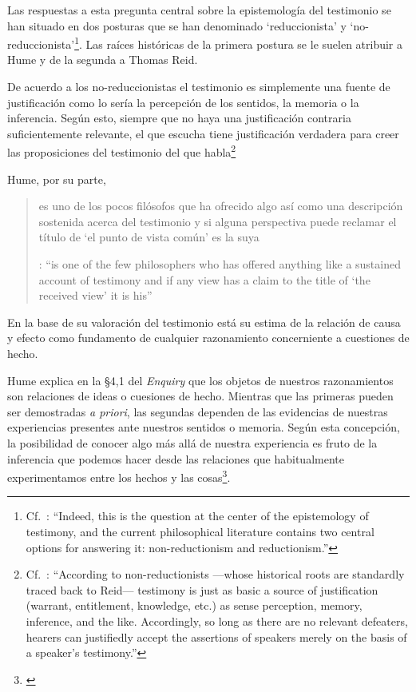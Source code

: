 Las respuestas a esta pregunta central sobre la epistemología del testimonio se han situado en dos posturas que se han denominado `reduccionista' y `no-reduccionista'\footnote{Cf.~\cite[4]{lackeysosa2006eptest}: \enquote{Indeed, this is the question at the center of the epistemology of testimony, and the current philosophical literature contains two central options for answering it: non-reductionism and reductionism.}}. Las raíces históricas de la primera postura se le suelen atribuir a Hume y de la segunda a Thomas Reid.

De acuerdo a los no-reduccionistas el testimonio es simplemente una fuente de justificación como lo sería la percepción de los sentidos, la memoria o la inferencia. Según esto, siempre que no haya una justificación contraria suficientemente relevante, el que escucha tiene justificación verdadera para creer las proposiciones del testimonio del que habla\footnote{Cf.~\cite[4]{lackeysosa2006eptest}: \enquote{According to non-reductionists ---whose historical roots are standardly traced back to Reid--- testimony is just as basic a source of justification (warrant, entitlement, knowledge, etc.) as sense perception, memory, inference, and the like. Accordingly, so long as there are no relevant defeaters, hearers can justifiedly accept the assertions of speakers merely on the basis of a speaker's testimony.}}

Hume, por su parte, \blockquote[{\cite[79]{coady1992test}}: \enquote{is one of the few philosophers who has offered anything like a sustained account of testimony and if any view has a claim to the title of `the received view' it is his}]{es uno de los pocos filósofos que ha ofrecido algo así como una descripción sostenida acerca del testimonio y si alguna perspectiva puede reclamar el título de `el punto de vista común' es la suya}. En la base de su valoración del testimonio está su estima de la relación de causa y efecto como fundamento de cualquier razonamiento concerniente a cuestiones de hecho.

Hume explica en la \S4,1 del \emph{Enquiry} que los objetos de nuestros razonamientos son relaciones de ideas o cuesiones de hecho. Mientras que las primeras pueden ser demostradas \emph{a priori}, las segundas dependen de las evidencias de nuestras experiencias presentes ante nuestros sentidos o memoria. Según esta concepción, la posibilidad de conocer algo más allá de nuestra experiencia es fruto de la inferencia que podemos hacer desde las relaciones que habitualmente experimentamos entre los hechos y las cosas\footnote{\cite[Cf.~][\S4, 1. 47-54]{hume1777enquiryes}}.

